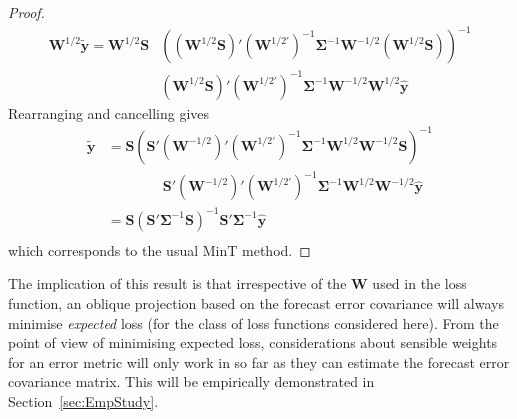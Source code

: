 \documentclass[12pt]{article}
\theoremstyle{definition}
\begin{document}
{\begin{proof}
	\begin{align*}
	\bm{W}^{1/2}\tilde{\bm{y}}=\bm{W}^{1/2}\bm{S}&\left((\bm{W}^{1/2}\bm{S})'(\bm{W}^{1/2'})^{-1}\bm{\Sigma}^{-1}\bm{W}^{-1/2}(\bm{W}^{1/2}\bm{S})\right)^{-1}\\
	&(\bm{W}^{1/2}\bm{S})'(\bm{W}^{1/2'})^{-1}\bm{\Sigma}^{-1}\bm{W}^{-1/2}\bm{W}^{1/2}\hat{\bm{y}}
	\end{align*}
	Rearranging and cancelling gives
	\begin{align*}
    \tilde{\bm{y}}&=\bm{S}\left(\bm{S}'(\bm{W}^{-1/2})'(\bm{W}^{1/2'})^{-1}\bm{\Sigma}^{-1}\bm{W}^{1/2}\bm{W}^{-1/2}\bm{S}\right)^{-1}\\
    &\qquad\qquad\bm{S}'(\bm{W}^{-1/2})'(\bm{W}^{1/2'})^{-1}\bm{\Sigma}^{-1}\bm{W}^{1/2}\bm{W}^{-1/2}\hat{\bm{y}}\\
	&=\bm{S}\left(\bm{S}'\bm{\Sigma}^{-1}\bm{S}\right)^{-1}\bm{S}'\bm{\Sigma}^{-1}\hat{\bm{y}}\\
	\end{align*}
	which corresponds to the usual MinT method.
\end{proof}

The implication of this result is that irrespective of the ${\bm W}$ used in the loss function, an oblique projection based on the forecast error covariance will always minimise {\em expected} loss (for the class of loss functions considered here).  From the point of view of minimising expected loss, considerations about sensible weights for an error metric will only work in so far as they can estimate the forecast error covariance matrix.  This will be empirically demonstrated in Section~\ref{sec:EmpStudy}.

 



}
\end{document}
